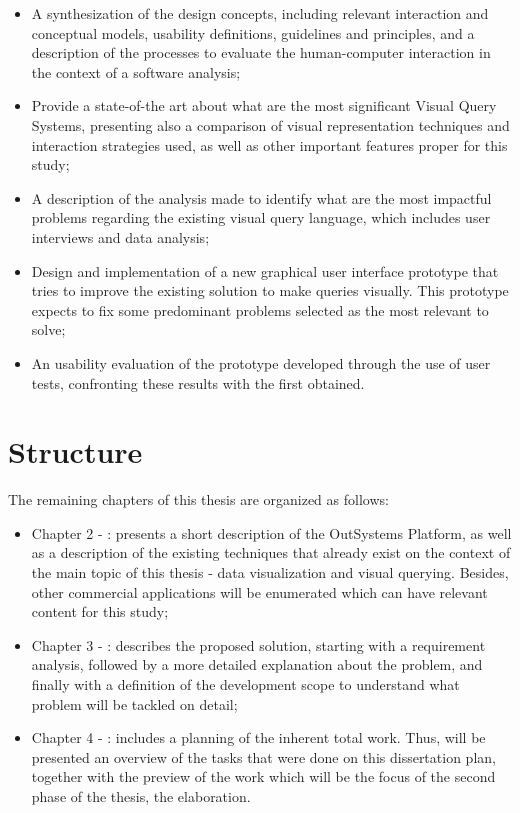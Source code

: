 \begin{itemize}
  \item A synthesization of the design concepts, including relevant interaction and conceptual models, usability definitions, guidelines and principles, and a description of the processes to evaluate the human-computer interaction in the context of a software analysis;
  \item Provide a state-of-the art about what are the most significant Visual Query Systems, presenting also a comparison of visual representation techniques and interaction strategies used, as well as other important features proper for this study;
  \item A description of the analysis made to identify what are the most impactful problems regarding the existing visual query language, which includes user interviews and data analysis;
  \item Design and implementation of a new graphical user interface prototype that tries to improve the existing solution to make queries visually. This prototype expects to fix some predominant problems selected as the most relevant to solve;
  \item An usability evaluation of the prototype developed through the use of user tests, confronting these results with the first obtained.
\end{itemize} 

\section{Structure}
\label{sec:structure}

The remaining chapters of this thesis are organized as follows:

\begin{itemize}
  \item Chapter 2 - : presents a short description of the OutSystems Platform, as well as a description of the existing techniques that already exist on the context of the main topic of this thesis - data visualization and visual querying. Besides, other commercial applications will be enumerated which can have relevant content for this study;
  \item Chapter 3 - : describes the proposed solution, starting with a requirement analysis, followed by a more detailed explanation about the problem, and finally with a definition of the development scope to understand what problem will be tackled on detail;
  \item Chapter 4 - : includes a planning of the inherent total work. Thus, will be presented an overview of the tasks that were done on this dissertation plan, together with the preview of the work which will be the focus of the second phase of the thesis, the elaboration.
\end{itemize}
